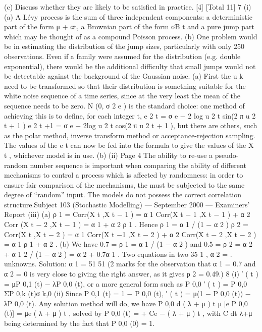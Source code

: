 \documentclass[a4paper,12pt]{article}
\begin{document}
\begin{enumerate}
(c) Discuss whether they are likely to be satisfied in practice.
[4]
[Total 11]
7
(i)
(a) A Lévy process is the sum of three independent components: a
deterministic part of the form μ + αt, a Brownian part of the form
σB t and a pure jump part which may be thought of as a compound
Poisson process.
(b) One problem would be in estimating the distribution of the jump
sizes, particularly with only 250 observations. Even if a family
were assumed for the distribution (e.g. double exponential), there
would be the additional difficulty that small jumps would not be
detectable against the background of the Gaussian noise.
(a) First the u k need to be transformed so that their distribution is
something suitable for the white noise sequence of a time series,
since at the very least the mean of the sequence needs to be zero.
N (0, σ 2 e ) is the standard choice: one method of achieving this is to
define, for each integer t,
e 2 t
= σ e − 2 log u 2 t sin(2 π u 2 t + 1 )
e 2 t +1 = σ e − 2log u 2 t cos(2 π u 2 t + 1 ),
but there are others, such as the polar method, inverse transform
method or acceptance-rejection sampling.
The values of the e t can now be fed into the formula to give the
values of the X t , whichever model is in use.
(b)
(ii)
Page 4
The ability to re-use a pseudo-random number sequence is
important when comparing the ability of different mechanisms to
control a process which is affected by randomness: in order to
ensure fair comparison of the mechanisms, the must be subjected
to the same degree of “random” input.
The models do not possess the correct correlation structure.Subject 103 (Stochastic Modelling) — September 2000 — Examiners’ Report
(iii)
(a)
ρ 1 = Corr(X t ,X t − 1 ) = α 1 Corr(X t − 1 ,X t − 1 ) + α 2 Corr (X t − 2 ,X t − 1 ) = α 1 + α 2 ρ 1 .
Hence ρ 1 = α 1 / (1 − α 2 )
ρ 2 = Corr(X t ,X t − 2 ) = α 1 Corr(X t −1 ,X t − 2 ) + α 2 Corr(X t − 2 ,X t − 2 ) = α 1 ρ 1 + α 2 .
(b)
We have 0.7 = ρ 1 = α 1 / (1 − α 2 )
and 0.5 = ρ 2 = α 2 + α 1 2 / (1 − α 2 ) = α 2 + 0.7α 1 . Two equations in two
35
1
, α 2 =
.
unknowns. Solution: α 1 =
51
51
(2 marks for the observation that α 1 = 0.7 and α 2 = 0 is very close
to giving the right answer, as it gives ρ 2 = 0.49.)
8
(i)
′ ( t ) = μP 0,1 (t) − λP 0,0 (t), or a more general form such as P 0,0
′ ( t ) =
P 0,0
ΣP 0,k (t)σ k,0
(ii)
Since P 0,1 (t) = 1 − P 0,0 (t),
′ ( t ) = μ(1 − P 0,0 (t)) − λP 0,0 (t). Any solution method will do,
we have P 0,0
d ( λ + μ ) t
μ
[e
P 0,0 (t)] = μe ( λ + μ ) t , solved by P 0,0 (t) =
+ Ce − ( λ + μ ) t , with C
dt
λ+μ
being determined by the fact that P 0,0 (0) = 1.

\end{enumerate}
\end{document}
